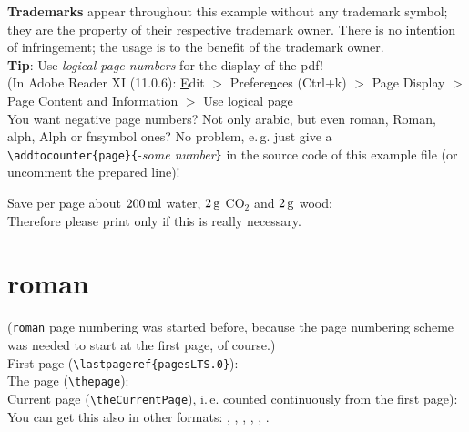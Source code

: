 \documentclass[british]{article}
\gdef\unit#1{\mathord{\thinspace\mathrm{#1}}}%
\begin{document}
\textbf{Trademarks} appear throughout this example without any
trademark symbol; they are the property of their respective
trademark owner. There is no intention of infringement; the
usage is to the benefit of the trademark owner.\\

\textbf{Tip}: Use \textit{logical page numbers} for
the display of the pdf!\\
(In Adobe Reader XI (11.0.6): \underline{E}dit $>$
Prefere\underline{n}ces (Ctrl+k) $>$ Page Display $>$
Page Content and Information $>$ Use logical page
\\

You want negative page numbers? Not only arabic, but even roman,
Roman, alph, Alph or fnsymbol ones? No problem, e.\,g. just give a\\
\verb|\addtocounter{page}{|-\textit{some number}\verb|}| in the
source code of this example file (or uncomment the prepared line)!

\bigskip

Save per page about $200\unit{ml}$ water, $2\unit{g}$ CO$_{2}$
and $2\unit{g}$ wood:\\
Therefore please print only if this is really necessary.

\pagebreak

\tableofcontents

\newpage


\section{roman}

\noindent (\texttt{roman} page numbering was started before,
because the page numbering scheme was needed to start at
the first page, of course.)\\

\noindent First page (\verb|\lastpageref{pagesLTS.0}|):
\\

\noindent The page (\verb|\thepage|): \thepage \\

\noindent Current page (\verb|\theCurrentPage|),
i.\,e. counted continuously from the first page): \theCurrentPage \\
You can get this also in other formats:
, , ,
, , .
\end{document}
